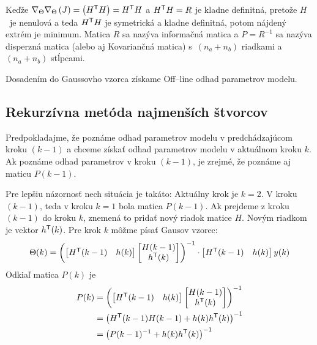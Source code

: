 \documentclass[a4paper, 10pt, ]{article}
\begin{document}
Keďže $\nabla_\Theta \nabla_\Theta \left(J \right) = \left(H^{\mathsf{T}} H \right) = H^{\mathsf{T}} H$ a $H^{\mathsf{T}}  H =  R$ je kladne definitná, pretože $ H$~je nenulová a teda $ H^{\mathsf{T}}  H$ je symetrická a kladne definitná, potom nájdený extrém je minimum. Matica $R$ sa nazýva informačná matica a $ P =  R^{-1}$ sa nazýva disperzná matica (alebo aj Kovariančná matica) s~$(n_a + n_b)$ riadkami a~$(n_a + n_b)$ stĺpcami.

Dosadením do Gaussovho vzorca získame Off--line odhad parametrov modelu.








\subsection{Rekurzívna metóda najmenších štvorcov}

Predpokladajme, že poznáme odhad parametrov modelu v predchádzajúcom kroku $(k-1)$ a chceme získať odhad parametrov modelu v aktuálnom kroku $k$. Ak poznáme odhad parametrov v kroku $(k-1)$, je zrejmé, že poznáme aj maticu $ P(k-1)$.

Pre lepšiu názornosť nech situácia je takáto: Aktuálny krok je $k = 2$. V kroku $(k-1)$, teda v kroku $k = 1$ bola matica $P(k-1)$. Ak prejdeme z kroku $(k-1)$ do kroku $k$, znemená to pridať nový riadok matice $H$. Novým riadkom je vektor $h^{\mathsf{T}}(k)$. Pre krok $k$ môžme písať Gausov vzorec:
\begin{equation}
	\Theta(k) = \left(
		\begin{bmatrix} H^{\mathsf{T}}(k-1) & h(k) \end{bmatrix}
		\begin{bmatrix} H(k-1) \\ h^{\mathsf{T}}(k) \end{bmatrix}
		\right)^{-1}
		\cdot
		\begin{bmatrix} H^{\mathsf{T}}(k-1) & h(k) \end{bmatrix}
		y(k)
\end{equation}
Odkiaľ matica $P(k)$ je
\begin{equation} \label{rekurP}
	\begin{split}
		P(k) & = \left(
			\begin{bmatrix} H^{\mathsf{T}}(k-1) & h(k) \end{bmatrix}
			\begin{bmatrix} H(k-1) \\ h^{\mathsf{T}}(k) \end{bmatrix}
			\right)^{-1}
		\\ & = \left( H^{\mathsf{T}}(k-1) H(k-1) + h(k) h^{\mathsf{T}}(k) \right)^{-1}
		\\ & = \left( P(k-1)^{-1} + h(k) h^{\mathsf{T}}(k) \right)^{-1}
	\end{split}
\end{equation}
\end{document}
